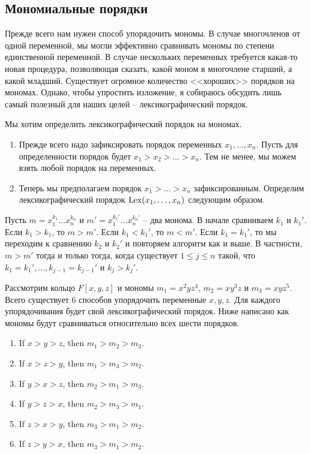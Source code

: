 \subsection{Мономиальные порядки}

Прежде всего нам нужен способ упорядочить мономы.
В случае многочленов от одной переменной, мы могли эффективно сравнивать мономы по степени единственной переменной.
В случае нескольких переменных требуется какая-то новая процедура, позволяющая сказать, какой моном в многочлене старший, а какой младший.
Существует огромное количество <<хороших>> порядков на мономах.
Однако, чтобы упростить изложение, я собираюсь обсудить лишь самый полезный для наших целей -- лексикографический порядок.

\begin{definition}
Мы хотим определить лексикографический порядок на мономах.
\begin{enumerate}
\item Прежде всего надо зафиксировать порядок переменных $x_1,\ldots,x_n$.
Пусть для определенности порядок будет $x_1 > x_2 > \ldots > x_n$.
Тем не менее, мы можем взять любой порядок на переменных.

\item Теперь мы предполагаем порядок $x_1 > \ldots > x_n$ зафиксированным.
Определим лексикографический порядок $\operatorname{Lex}(x_1,\ldots,x_n)$ следующим образом.
\end{enumerate}
Пусть $m = x_1^{k_1}\ldots x_n^{k_n}$ и $m'= x_1^{k_1'}\ldots x_n^{k_n'}$ -- два монома.
В начале сравниваем $k_1$ и $k_1'$.
Если $k_1 > k_1$, то $m > m'$.
Если $k_1 < k_1'$, то $m < m'$.
Если $k_1 = k_1'$, то мы переходим к сравнению $k_2$ и $k_2'$ и повторяем алгоритм как и выше.
В частности, $m > m'$ тогда и только тогда, когда существует $1\leqslant j \leqslant n$ такой, что $k_1 = k_1',\ldots, k_{j-1} = k_{j-1}'$ и $k_j > k_j'$.
\end{definition}

\begin{examples}
Рассмотрим кольцо $F[x, y, z]$ и мономы $m_1 = x^2 y z^4$, $m_2 = x y^3 z$ и $m_3 = x y z^5$.
Всего существует $6$ способов упорядочить переменные $x, y, z$.
Для каждого упорядочивания будет свой лексикографический порядок.
Ниже написано как мономы будут сравниваться относительно всех шести порядков.
\begin{enumerate}
\item If $x > y > z$, then $m_1 > m_2 > m_3$.

\item If $x > z > y$, then $m_1 > m_3 > m_2$.

\item If $y > x > z$, then $m_2 > m_1 > m_3$.

\item If $y > z > x$, then $m_2 > m_3 > m_1$.

\item If $z > x > y$, then $m_3 > m_1 > m_2$.

\item If $z > y > x$, then $m_3 > m_1 > m_2$.
\end{enumerate}
\end{examples}


